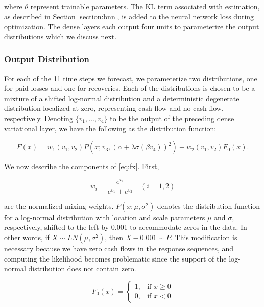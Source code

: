\documentclass{article}
\begin{document}
where $\theta$ represent trainable parameters. The KL term associated with estimation, as described in Section \ref{section:bnn}, is added to the neural network loss during optimization. The dense layers each output four units to parameterize the output distributions which we discuss next.

\subsubsection{Output Distribution}\label{section:outputdist}

For each of the 11 time steps we forecast, we parameterize two distributions, one for paid losses and one for recoveries. Each of the distributions is chosen to be a mixture of a shifted log-normal distribution and a deterministic degenerate distribution localized at zero, representing cash flow and no cash flow, respectively. Denoting $\{v_1,\dots,v_4\}$ to be the output of the preceding dense variational layer, we have the following as the distribution function:

\begin{equation} \label{eq:fx}
    F(x) = w_1(v_1, v_2)P(x; v_3, (\alpha + \lambda\sigma(\beta v_4))^2) + w_2(v_1, v_2)F_0(x).
\end{equation}

We now describe the components of \ref{eq:fx}. First, 

\begin{equation}
    w_i = \frac{e^{v_i}}{e^{v_1} + e^{v_2}}\quad (i = 1, 2)
\end{equation}

are the normalized mixing weights. $P(x; \mu, \sigma^2)$ denotes the distribution function for a log-normal distribution with location and scale parameters $\mu$ and $\sigma$, respectively, shifted to the left by 0.001 to accommodate zeros in the data. In other words, if $X \sim LN(\mu, \sigma^2)$, then $X - 0.001 \sim P$. This modification is necessary because we have zero cash flows in the response sequences, and computing the likelihood becomes problematic since the support of the log-normal distribution does not contain zero.

\begin{equation}
    F_{0}(x)=\left\{\begin{matrix} 1, & \mbox{if }x\ge 0 \\ 0, & \mbox{if }x<0 \end{matrix}\right.
\end{equation}
\end{document}
